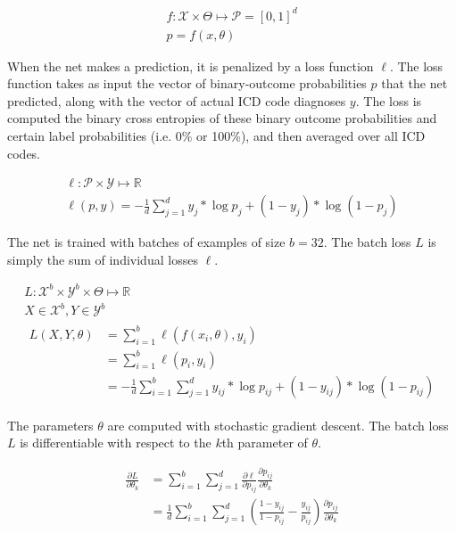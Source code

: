 \begin{gather}
    f: \mathcal{X} \times \Theta \mapsto \mathcal{P} = [0, 1]^d \\
    p = f(x, \theta)
\end{gather}

When the net makes a prediction, it is penalized by a loss function $\ell$.  The loss function takes as input the vector of binary-outcome probabilities $p$ that the net predicted, along with the vector of actual ICD code diagnoses $y$.  The loss is computed the binary cross entropies of these binary outcome probabilities and certain label probabilities (i.e. 0\% or 100\%), and then averaged over all ICD codes.

\begin{gather}
    \ell: \mathcal{P} \times \mathcal{Y} \mapsto \mathbb{R} \\
    \ell(p, y) = -\frac{1}{d} \sum_{j=1}^d 
        y_j * \log p_j + (1 - y_j) * \log(1 - p_j)
\end{gather}

The net is trained with batches of examples of size $b = 32$.  The batch loss $L$ is simply the sum of individual losses $\ell$.

\begin{gather}
    L : \mathcal{X}^b \times \mathcal{Y}^b 
        \times \Theta \mapsto \mathbb{R} \\
    X \in \mathcal{X}^b, Y \in \mathcal{Y}^b \\
    \begin{aligned}
        L(X, Y, \theta) 
            &= \sum_{i=1}^b \ell(f(x_i, \theta), y_i) \\
            &= \sum_{i=1}^b \ell(p_i, y_i) \\
            &= -\frac{1}{d} \sum_{i=1}^b \sum_{j=1}^d 
                y_{ij} * \log p_{ij} + (1 - y_{ij}) * \log(1 - p_{ij})
    \end{aligned}
\end{gather}

The parameters $\theta$ are computed with stochastic gradient descent.  The batch loss $L$ is differentiable with respect to the $k$th parameter of $\theta$.

\begin{align}
    \frac{\partial L}{\partial \theta_k} 
        &= \sum_{i=1}^b \sum_{j=1}^d 
            \frac{\partial \ell}{\partial p_{ij}}  
            \frac{\partial p_{ij}}{\partial \theta_k} \\
        &= \frac{1}{d} \sum_{i=1}^b \sum_{j=1}^d
            \left(
                \frac{1 - y_{ij}}{1 - p_{ij}} - \frac{y_{ij}}{p_{ij}}
            \right)
            \frac{\partial p_{ij}}{\partial \theta_k}
\end{align}

